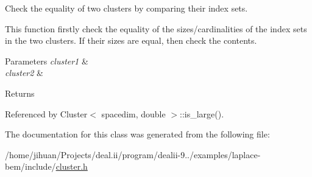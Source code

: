 Check the equality of two clusters by comparing their index sets.

This function firstly check the equality of the sizes/cardinalities of the index sets in the two clusters. If their sizes are equal, then check the contents.


\begin{DoxyParams}{Parameters}
{\em cluster1} & \\
\hline
{\em cluster2} & \\
\hline
\end{DoxyParams}
\begin{DoxyReturn}{Returns}

\end{DoxyReturn}


Referenced by Cluster$<$ spacedim, double $>$\+::is\+\_\+large().



The documentation for this class was generated from the following file\+:\begin{DoxyCompactItemize}
\item 
/home/jihuan/\+Projects/deal.\+ii/program/dealii-\/9../examples/laplace-\/bem/include/\hyperlink{cluster_8h}{cluster.\+h}\end{DoxyCompactItemize}
